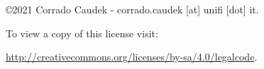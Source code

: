 
%
%


\thispagestyle{empty}

\null


\vfill

\begin{flushright}
    \copyright  2021 Corrado Caudek - corrado.caudek [at] unifi [dot] it.
    
    \bigskip
    
    \doclicenseLongText
        
    To view a copy of this license visit:
 
    \url{http://creativecommons.org/licenses/by-sa/4.0/legalcode}.
    
    \bigskip
    
    \doclicenseImage[imagewidth=5.5em]
    
\end{flushright}



